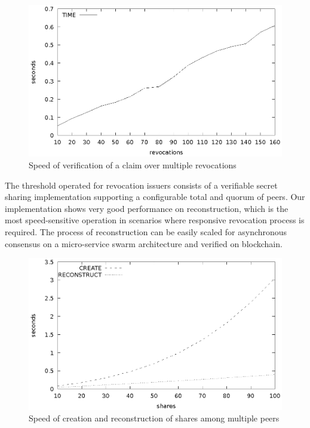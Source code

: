 \begin{figure}
    \centering
    \includegraphics[width=1\linewidth]{verifyrevocations.eps}

    \caption{Speed of verification of a claim over multiple revocations}
    \label{fig:verifyrevocations}
\end{figure}

The threshold operated for revocation issuers consists of a verifiable
secret sharing implementation supporting a configurable total and
quorum of peers. Our implementation shows very good performance on
reconstruction, which is the most speed-sensitive operation in
scenarios where responsive revocation process is required. The process
of reconstruction can be easily scaled for asynchronous consensus on a
micro-service swarm architecture and verified on blockchain.

\begin{figure}
    \centering
    \includegraphics[width=1\linewidth]{pvss.eps}
    \caption{Speed of creation and reconstruction of shares among multiple peers}
    \label{fig:pvss}
\end{figure}


